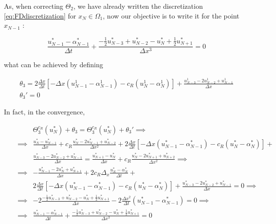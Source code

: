 \indent As, when correcting $\Theta_2$, we have already written the discretization \eqref{eq:FDdiscretization} for $x_N \in \Omega_1$, now our objective is to write it for the point $x_{N-1}$ :

\begin{equation*}
    \label{eq:FDdiscretizationNm1}
    \frac{u_{N-1}^* - \alpha_{N-1}^*}{\Delta t} + \frac{-\frac{1}{2}u_{N-3}^* + u_{N-2}^* - u_{N}^* + \frac{1}{2}u_{N+1}^* }{\Delta x ^3} = 0
\end{equation*}

\noindent what can be achieved by defining

\begin{equation*}
\begin{gathered}
    \theta_3 = 2\frac{\Delta x}{\Delta t} \left[-\Delta x(u_{N-1}^1 - \alpha_{N-1}^1) - c_R (u_N^1 - \alpha_N^1) \right] + \frac{u_{N-3}^1 - 2u_{N-2}^1 + u_{N-1}^1}{\Delta x} \\
    \theta_3' = 0
\end{gathered}
\end{equation*}

\indent In fact, in the convergence,

\begin{align*}
\label{eq:modifiedTBC3}
&&  &\Theta_3^{c_R}(u_N^*) + \theta_3 = \Theta_3^{c_R}(u_N^*) + \theta_3'     \implies \\
&& \implies & \frac{u_N^* - u_{N-1}^*}{\Delta x} + c_R \frac{u_N^* - 2u_{N-1}^* + u_{N-2}^*}{\Delta x^2} + 2\frac{\Delta x}{\Delta t}  \left[-\Delta x(u_{N-1}^* - \alpha_{N-1}^*) - c_R (u_N^* - \alpha_N^*) \right] + \\
&&   & 			\frac{u_{N-3}^* - 2u_{N-2}^* + u_{N-1}^*}{\Delta x}  =  \frac{u_{N+1}^* - u_{N}^*}{\Delta x} + c_R \frac{u_N^* - 2u_{N+1}^* + u_{N+2}^*}{\Delta x^2} \implies \\
&&  \implies &  -\frac{u_{N-1}^* - 2 u_{N}^* + u_{N+1}^*}{\Delta x} + 2c_R\Delta_x\frac{u_N^* - \alpha_N^*}{\Delta t} + \\
&&   & 2\frac{\Delta x}{\Delta t} \left[-\Delta x(u_{N-1}^* - \alpha_{N-1}^*) - c_R(u_N^* - \alpha_N^*) \right] + \frac{u_{N-3}^* - 2u_{N-2}^* + u_{N-1}^*}{\Delta x} = 0 \implies \\
&& \implies  & -2\frac{-\frac{1}{2}u_{N-3}^* + u_{N-2}^* - u_{N}^* + \frac{1}{2}u_{N+1}^* }{\Delta x} - 2\frac{\Delta x^2}{\Delta t}(u_{N-1}^* - 					\alpha_{N-1}^*) = 0 \implies \\
&& \implies &  \frac{u_{N-1}^* - \alpha_{N-1}^*}{\Delta t} + \frac{-\frac{1}{2}u_{N-3}^* + u_{N-2}^* - u_{N}^* + \frac{1}{2}u_{N+1}^* }{\Delta x ^3} = 0
\end{align*}

